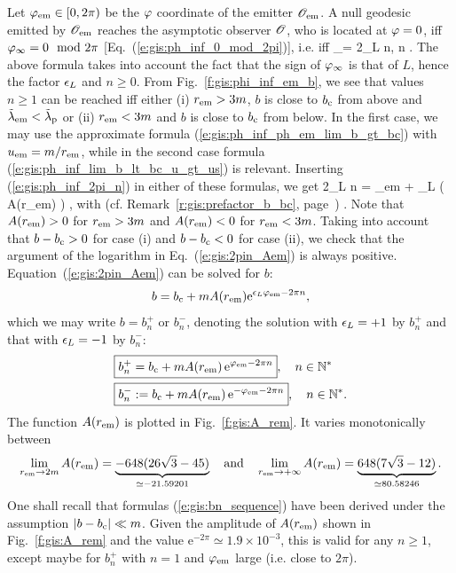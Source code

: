 Let $\varphi_{\rm em}\in {[0, 2\pi)}$ be the $\varphi$ coordinate of the emitter $\mathscr{O}_{\rm em}$.
A null geodesic emitted by $\mathscr{O}_{\rm em}$ reaches the asymptotic observer $\mathscr{O}$, who is located at $\varphi=0$, iff $\varphi_\infty = 0 \mod 2\pi$ [Eq.~(\ref{e:gis:ph_inf_0_mod_2pi})],
i.e. iff
\be \label{e:gis:ph_inf_2pi_n}
    \ph_\infty = 2\pi\eps_L n, \qquad n\in{} .
\ee
The above formula takes into account the fact that the sign of $\varphi_\infty$
is that of $L$, hence the factor $\epsilon_L$ and $n\geq 0$.
From Fig.~\ref{f:gis:phi_inf_em_b}, we see that values $n \geq 1$ can be
reached iff either (i) $r_{\rm em} > 3m$, $b$ is close to $b_{\rm c}$ from above and ${\tilde\lambda}_{\rm em} < {\tilde\lambda}_{\rm p}$ or (ii) $r_{\rm em} < 3m$ and $b$ is close to
$b_{\rm c}$ from below.
In the first case, we may use the approximate formula
(\ref{e:gis:ph_inf_ph_em_lim_b_gt_bc}) with $u_{\rm em} = m/r_{\rm em}$, while in the second
case formula (\ref{e:gis:ph_inf_lim_b_lt_bc_u_gt_us}) is relevant.
Inserting (\ref{e:gis:ph_inf_2pi_n}) in either of these formulas, we get
\be \label{e:gis:2pin_Aem}
     2\pi\eps_L n = \ph_{\rm em}
   + \eps_L \ln \left( A(r_{\rm em})   \right) ,
\ee
with (cf. Remark~\ref{r:gis:prefactor_b_bc}, page~\pageref{r:gis:prefactor_b_bc})
\be \label{e:gis:def_A_rem}
    .
\ee
Note that $A(r_{\rm em})  > 0$ for $r_{\rm em} > 3 m$ and
$A(r_{\rm em})  < 0$ for $r_{\rm em} < 3 m$. Taking into account
that $b - b_{\rm c} > 0$ for case (i) and $b - b_{\rm c} < 0$ for case (ii),
we check that
the argument of the logarithm in Eq.~(\ref{e:gis:2pin_Aem}) is always
positive.
Equation~(\ref{e:gis:2pin_Aem}) can be solved for $b$:
\[
    b = b_{\rm c} + m A(r_{\rm em})  \mathrm{e}^{\epsilon_L \varphi_{\rm em} - 2\pi n},
\]
which we may write $b = b_n^+$ or $b_n^-$, denoting the solution with $\epsilon_L=+1$ by $b_n^+$
and that with $\epsilon_L=-1$ by $b_n^-$:
\begin{subequations}
\label{e:gis:bn_sequence}
\begin{align}
& \fbox{$\displaystyle b_n^+ = b_{\rm c} + m A(r_{\rm em})\, \mathrm{e}^{\varphi_{\rm em} - 2\pi n}$},\quad
n\in \mathbb{N}^* \\
& \fbox{$\displaystyle b_n^- := b_{\rm c} + m A(r_{\rm em})\,  \mathrm{e}^{- \varphi_{\rm em} - 2\pi n}$},\quad
n\in \mathbb{N}^* .
\end{align}
\end{subequations}
The function $A(r_{\rm em})$ is plotted in Fig.~\ref{f:gis:A_rem}.
It varies monotonically between
\[
\lim_{r_{\rm em}\to 2m} A(r_{\rm em}) = \underbrace{- 648(26\sqrt{3} - 45)}_{\simeq -21.59201}
\quad\mbox{and}\quad
\lim_{r_{\rm em}\to +\infty} A(r_{\rm em}) = \underbrace{648(7\sqrt{3} - 12)}_{\simeq 80.58246}.
\]
One shall recall that formulas (\ref{e:gis:bn_sequence}) have been derived
under the assumption $|b - b_{\rm c}| \ll m$. Given the amplitude of $A(r_{\rm em})$
shown in Fig.~\ref{f:gis:A_rem} and the value $\mathrm{e}^{-2\pi} \simeq 1.9\times 10^{-3}$,
this is valid for any $n\geq 1$, except maybe for $b_n^+$ with $n=1$ and $\varphi_{\rm em}$
large (i.e. close to $2\pi$).

